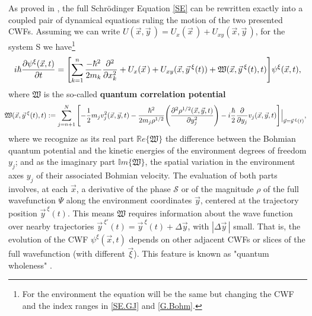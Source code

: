 \documentclass[11pt, a4paper]{article} %
\newcommand{\R}{\mathbb{R}} %
\begin{document}
As proved in \cite{GJ}, the full Schrödinger Equation \eqref{SE} can be rewritten exactly into a coupled pair of dynamical equations ruling the motion of the two presented CWFs. Assuming we can write $U(\vec{x},\vec{y}\,)=U_x(\vec{x}\,)+U_{xy}(\vec{x},\vec{y}\,)$, for the system S we have\footnote{ For the environment the equation will be the same but changing the CWF and the index ranges in \eqref{SE.GJ} and \eqref{G.Bohm}.}\vspace{-0.1cm}
\begin{equation}\label{SE.GJ}
i \hbar \pdv{\psi^\xi (\vec{x},t)}{t} = \qty[\sum_{k=1}^n\frac{-\hbar^2}{2m_k} \pdv[2]{}{x_k} + U_x(\vec{x}\,)+ U_{xy}(\vec{x}, \vec{y}^{\: \xi}(t)) + \mathfrak{W}(\vec{x}, \vec{y}^{\: \xi}(t),t)] \psi^\xi (\vec{x},t),
\end{equation}
where $\mathfrak{W}$ is the so-called {\bf quantum correlation potential}
\begin{equation}\label{G.Bohm}\hspace{-0.2cm}
\mathfrak{W}(\vec{x},\vec{y}^{\:\xi}(t),t):=\sum_{j=n+1}^N\qty[-\frac{1}{2}m_jv_j^2(\vec{x},\vec{y},t)-\frac{\hbar^2}{2m_j\rho^{1/2}}\qty(\pdv[2]{\rho^{1/2}(\vec{x},\vec{y},t)}{y_j}) -i\frac{\hbar}{2}\pdv{}{y_j}v_j(\vec{x},\vec{y},t)]\Big\rvert_{\vec{y}=\vec{y}^{\:\xi}(t)},\vspace{-0.1cm}
\end{equation}
where we recognize as its real part $\R e\{\mathfrak{W}\}$ the difference between the Bohmian quantum potential \cite{JordiXavier, Durr} and the kinetic energies of the environment degrees of freedom $y_j$; and as the imaginary part $\mathbb{I}m\{\mathfrak{W}\}$, the spatial variation in the environment axes $y_j$ of their associated Bohmian velocity. The evaluation of both parts involves, at each $\vec{x}$, a derivative of the phase $\mathcal{S}$ or of the magnitude $\rho$ of the full wavefunction $\Psi$ along the environment coordinates $\vec{y}$, centered at the trajectory position $\vec{y}^{\:\xi}(t)$. This means $\mathfrak{W}$ requires information about the wave function over nearby trajectories $\vec{y}^{\:\xi'}(t)=\vec{y}^{\:\xi}(t)+\Delta \vec y$, with $|\Delta\vec y\, |$ small. That is, the evolution of the CWF $\psi^\xi (\vec{x},t)$ depends on other adjacent CWFs or slices of the full wavefunction (with different $\vec{\xi}$). This feature is known as "quantum wholeness" \cite{JordiXavier}.
\end{document}

